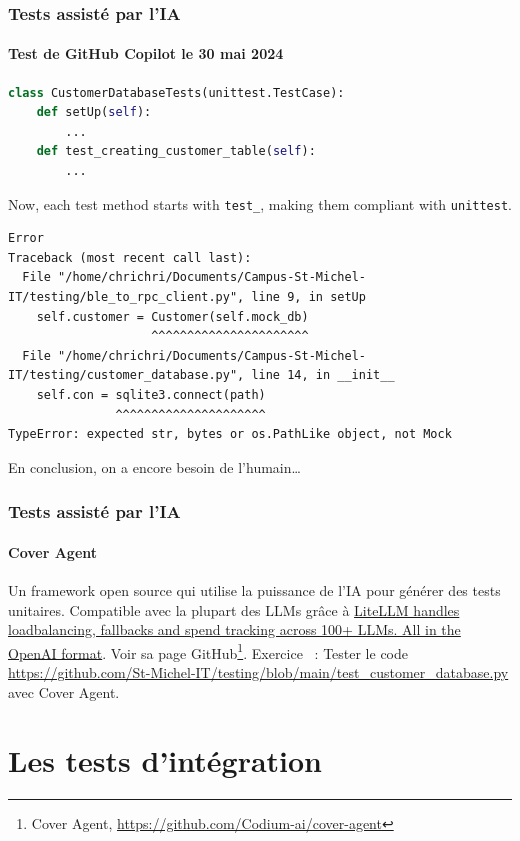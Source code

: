 \documentclass{beamer}
\begin{document}
    \begin{frame}[fragile]
        \transdissolve
        \frametitle{Tests assisté par l'IA}
        \framesubtitle{Test de GitHub Copilot le 30 mai 2024}
        \begin{lstlisting}[language=Python]
class CustomerDatabaseTests(unittest.TestCase):
    def setUp(self):
        ...
    def test_creating_customer_table(self):
        ...
        \end{lstlisting}
        Now, each test method starts with \lstinline{test_}, making them compliant with \lstinline{unittest}.
        \begin{lstlisting}
Error
Traceback (most recent call last):
  File "/home/chrichri/Documents/Campus-St-Michel-IT/testing/ble_to_rpc_client.py", line 9, in setUp
    self.customer = Customer(self.mock_db)
                    ^^^^^^^^^^^^^^^^^^^^^^
  File "/home/chrichri/Documents/Campus-St-Michel-IT/testing/customer_database.py", line 14, in __init__
    self.con = sqlite3.connect(path)
               ^^^^^^^^^^^^^^^^^^^^^
TypeError: expected str, bytes or os.PathLike object, not Mock
        \end{lstlisting}
        En conclusion, on a encore besoin de l'humain\ldots
    \end{frame}

    \begin{frame}[fragile]
        \transdissolve
        \frametitle{Tests assisté par l'IA}
        \framesubtitle{Cover Agent}
        Un framework open source qui utilise la puissance de l'IA pour générer des tests unitaires.
        Compatible avec la plupart des LLMs grâce à \href{https://www.litellm.ai/}{LiteLLM handles loadbalancing, fallbacks and spend tracking across 100+ LLMs. All in the OpenAI format}.
        Voir sa page GitHub\footnote{Cover Agent, \url{https://github.com/Codium-ai/cover-agent}}.
        \bigbreak
        Exercice \execcounterdispinc{}~: Tester le code \url{https://github.com/St-Michel-IT/testing/blob/main/test_customer_database.py} avec Cover Agent.
    \end{frame}


    \section{Les tests d’intégration}\label{sec:les-tests-d-integration}
\end{document}
